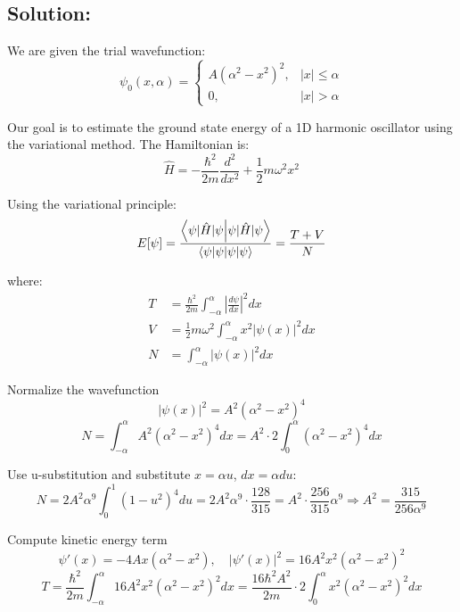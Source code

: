 \documentclass[12pt]{article}
\begin{document}
    \subsection{Solution:}
        We are given the trial wavefunction:
        \[
            \psi_0(x, \alpha) = 
            \begin{cases}
                A(\alpha^2 - x^2)^2, & |x| \leq \alpha \\
                0, & |x| > \alpha
            \end{cases}
        \]

        Our goal is to estimate the ground state energy of a 1D harmonic oscillator using the variational method. The Hamiltonian is:
        \[
            \hat{H} = -\frac{\hbar^2}{2m} \frac{d^2}{dx^2} + \frac{1}{2} m\omega^2 x^2
        \]

        Using the variational principle:
        \[
            E[\psi] = \frac{\braket{\psi|\hat{H}|\psi}}{\braket{\psi|\psi}} = \frac{T + V}{N}
        \]

        where:
        \begin{align*}
            T &= \frac{\hbar^2}{2m} \int_{-\alpha}^{\alpha} \left| \frac{d\psi}{dx} \right|^2 dx \\
            V &= \frac{1}{2} m\omega^2 \int_{-\alpha}^{\alpha} x^2 |\psi(x)|^2 dx \\
            N &= \int_{-\alpha}^{\alpha} |\psi(x)|^2 dx
        \end{align*}

        Normalize the wavefunction
        \[
            |\psi(x)|^2 = A^2 (\alpha^2 - x^2)^4
        \]
        \[
            N = \int_{-\alpha}^{\alpha} A^2 (\alpha^2 - x^2)^4 dx = A^2 \cdot 2 \int_0^{\alpha} (\alpha^2 - x^2)^4 dx
        \]

        Use u-substitution and substitute \( x = \alpha u \), \( dx = \alpha du \):
        \[
            N = 2A^2 \alpha^9 \int_0^1 (1 - u^2)^4 du = 2A^2 \alpha^9 \cdot \frac{128}{315} = A^2 \cdot \frac{256}{315} \alpha^9
            \Rightarrow A^2 = \frac{315}{256 \alpha^9}
        \]

        Compute kinetic energy term
        \[
            \psi'(x) = -4A x (\alpha^2 - x^2), \quad
            |\psi'(x)|^2 = 16A^2 x^2 (\alpha^2 - x^2)^2
        \]
        \[
            T = \frac{\hbar^2}{2m} \int_{-\alpha}^{\alpha} 16A^2 x^2 (\alpha^2 - x^2)^2 dx
            = \frac{16\hbar^2 A^2}{2m} \cdot 2 \int_0^\alpha x^2 (\alpha^2 - x^2)^2 dx
        \]
        
\end{document}
